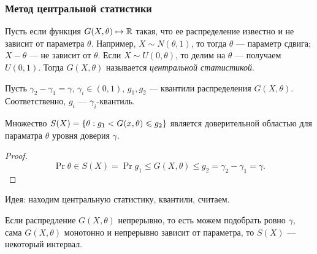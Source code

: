 \subsubsection{Метод центральной статистики}
Пусть если функция \(G(X, \theta) \mapsto \mathbb{R}\) такая, что ее распределение известно и не зависит от параметра \(\theta\).
Например, \(X \sim N(\theta, 1)\), то тогда \(\theta\) --- параметр сдвига; \(X - \theta\) --- не зависит от \(\theta\). Если \(X \sim U(0, \theta)\), то делим на \(\theta\) --- получаем \(U(0, 1)\). Тогда \(G(X, \theta)\) называется \textit{центральной статистикой}.

Пусть \(\gamma_2 - \gamma_1 = \gamma\), \(\gamma_i \in (0, 1)\), \(g_1, g_2\) --- квантили распределения \(G(X, \theta)\). Соответственно, \(g_i\) --- \(\gamma_i\)-квантиль.
\begin{remark}
    Множество \(S(X) = \left\{\theta: g_1 < G(x, \theta) \leqslant g_2\right\}\) является доверительной областью для параматра \(\theta\) уровня доверия \(\gamma\).
\end{remark}
\begin{proof}
    \begin{displaymath}
        \Pr{\theta \in S(X)} = \Pr{g_1 \leq G(X, \theta) \leq g_2} = \gamma_2 - \gamma_1 = \gamma.
    \end{displaymath}
\end{proof}
Идея: находим центральную статистику, квантили, считаем.

Если распредление \(G(X, \theta)\) непрерывно, то есть можем подобрать ровно \(\gamma\), сама \(G(X, \theta)\) монотонно и непрерывно зависит от параметра, то \(S(X)\) --- некоторый интервал.

